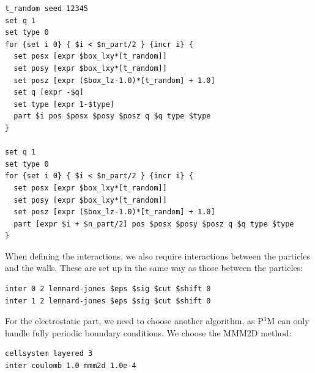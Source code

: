 \documentclass[
a4paper,                        %
11pt,                           %
twoside,                        %
footsepline,                    %
headsepline,                    %
headexclude,                    %
footexclude,                    %
pagesize,                       %
]{scrartcl}
\newtheorem{task}{Task}
\begin{document}
{\small\vspace{0,2cm}
\begin{lstlisting}[numbers=none]
t_random seed 12345
set q 1
set type 0
for {set i 0} { $i < $n_part/2 } {incr i} {
  set posx [expr $box_lxy*[t_random]]
  set posy [expr $box_lxy*[t_random]]
  set posz [expr ($box_lz-1.0)*[t_random] + 1.0]
  set q [expr -$q]
  set type [expr 1-$type]
  part $i pos $posx $posy $posz q $q type $type
}

set q 1
set type 0
for {set i 0} { $i < $n_part/2 } {incr i} {
  set posx [expr $box_lxy*[t_random]]
  set posy [expr $box_lxy*[t_random]]
  set posz [expr ($box_lz-1.0)*[t_random] + 1.0]
  part [expr $i + $n_part/2] pos $posx $posy $posz q $q type $type
}
\end{lstlisting}\vspace{0,2cm}
}

\vspace{1cm}
\vspace{1cm}

\noindent When defining the interactions, we also require interactions between the particles and the walls. These are set up in the same way as those between the particles:

{\small\vspace{0,2cm}
\begin{lstlisting}[numbers=none]
inter 0 2 lennard-jones $eps $sig $cut $shift 0
inter 1 2 lennard-jones $eps $sig $cut $shift 0
\end{lstlisting}\vspace{0,2cm}
}

For the electrostatic part, we need to choose another algorithm, as P$^3$M can only handle fully periodic boundary conditions. We choose the MMM2D method:

{\small\vspace{0,2cm}
\begin{lstlisting}[numbers=none]
cellsystem layered 3
inter coulomb 1.0 mmm2d 1.0e-4
\end{lstlisting}\vspace{0,2cm}
}
\end{document}
